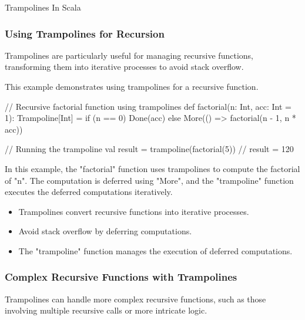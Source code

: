 \begin{notes}{Trampolines In Scala}
\begin{highlight}
    \end{highlight}
    
    \subsubsection*{Using Trampolines for Recursion}
    
    Trampolines are particularly useful for managing recursive functions, transforming them into iterative processes to avoid stack overflow.
    
    \begin{highlight}
    
        This example demonstrates using trampolines for a recursive function.
    
    \begin{code}[Scala]
    // Recursive factorial function using trampolines
    def factorial(n: Int, acc: Int = 1): Trampoline[Int] =
        if (n == 0) Done(acc)
        else More(() => factorial(n - 1, n * acc))
    
    // Running the trampoline
    val result = trampoline(factorial(5))  // result = 120
    \end{code}
    
        In this example, the "factorial" function uses trampolines to compute the factorial of "n". The computation is deferred using "More", and the "trampoline" function executes the deferred 
        computations iteratively.
    
        \begin{itemize}
            \item Trampolines convert recursive functions into iterative processes.
            \item Avoid stack overflow by deferring computations.
            \item The "trampoline" function manages the execution of deferred computations.
        \end{itemize}
    
    \end{highlight}
    
    \subsubsection*{Complex Recursive Functions with Trampolines}
    
    Trampolines can handle more complex recursive functions, such as those involving multiple recursive calls or more intricate logic.
    

\end{notes}
